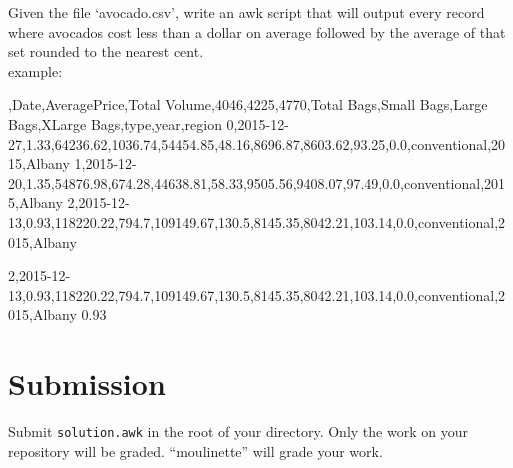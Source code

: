 \documentclass{42-en}
\begin{document}
    Given the file `avocado.csv', write an awk script that will output
    every record where avocados cost less than a dollar on average followed
    by the average of that set rounded to the nearest cent.\\

    example:
    \begin{42console}
,Date,AveragePrice,Total Volume,4046,4225,4770,Total Bags,Small Bags,Large Bags,XLarge Bags,type,year,region
0,2015-12-27,1.33,64236.62,1036.74,54454.85,48.16,8696.87,8603.62,93.25,0.0,conventional,2015,Albany
1,2015-12-20,1.35,54876.98,674.28,44638.81,58.33,9505.56,9408.07,97.49,0.0,conventional,2015,Albany
2,2015-12-13,0.93,118220.22,794.7,109149.67,130.5,8145.35,8042.21,103.14,0.0,conventional,2015,Albany
	\end{42console}
    \begin{42console}
2,2015-12-13,0.93,118220.22,794.7,109149.67,130.5,8145.35,8042.21,103.14,0.0,conventional,2015,Albany
0.93
%
    \end{42console}

\chapter{Submission}

    Submit \texttt{solution.awk} in the root of your directory.
    Only the work on your repository will be graded.
    ``moulinette'' will grade your work.\\
\end{document}
